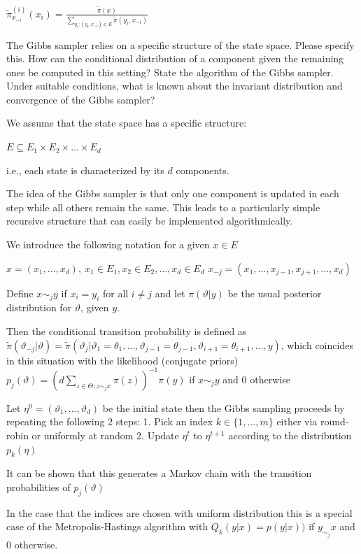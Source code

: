 \(\tilde{\pi}_{x_{-i}}^{(i)}(x_i) = \frac{\tilde{\pi}(x)}{\sum_{y_i : (y_i, x_{-i}) \in E} \tilde{\pi}(y_i, x_{-i})}\)

The Gibbs sampler relies on a specific structure of the state space. Please specify
this. How can the conditional distribution of a component given the remaining
ones be computed in this setting? State the algorithm of the Gibbs sampler.
Under suitable conditions, what is known about the invariant distribution and
convergence of the Gibbs sampler?

We assume that the state space has a specific structure:

\(E \subseteq E_1 \times E_2 \times \dots \times E_d\)

i.e., each state is characterized by its \(d\) components.

The idea of the Gibbs sampler is that only one component is updated in each step while all others remain the same. 
This leads to a particularly simple recursive structure that can easily be implemented algorithmically.

We introduce the following notation for a given \(x \in E\)

\(
x = (x_1, ..., x_d),\ x_1 \in E_1, x_2 \in E_2, \dots, x_d \in E_d 
\)
\(x_{-j} = (x_1, ..., x_{j-1}, x_{j+1}, \dots, x_d)\)

Define \( x \sim_j y \) if \( x_i = y_i \) for all \( i \neq j \) and let \( \pi(\vartheta|y) \) be the usual
posterior distribution for \( \vartheta \), given \( y \).

Then the conditional transition probability is defined as
\( \tilde{\pi}(\vartheta_{-j}|\vartheta) = \tilde{\pi}(\vartheta_{j}|\vartheta_1 = \theta_1, \dots, \vartheta_{j-1} = \theta_{j-1}, \vartheta_{i+1} = \theta_{i+1}, \dots, y) \), which coincides in this situation with the likelihood (conjugate priors)
\( p_j(\vartheta) = (d\sum_{z \in \Theta; z \sim_j x} \pi(z))^{-1}\pi(y) \) if \( x \sim_j y \) and \( 0 \) otherwise

Let \( \eta^{0} = (\vartheta_1, \dots, \vartheta_d) \) be the initial state then the Gibbs sampling proceeds by repeating the following 2 steps:
1. Pick an index \( k \in \{1, . . . , m\} \) either via round-robin or uniformly at random
2. Update \(\eta^{t}\) to \( \eta^{t+1} \) according to the distribution \(p_k(\eta)\)

It can be shown that this generates a Markov chain with the transition probabilities of \( p_j(\vartheta) \)

In the case that the indices are chosen with uniform distribution this is a special case  
of the Metropolis-Hastings algorithm with \( Q_k(y|x) = p(y|x)) \) if \( y_ \sim_j x \) and \( 0 \) otherwise.

